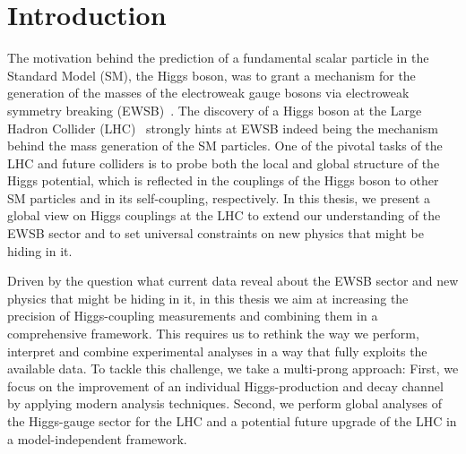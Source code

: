 %
%
%

\chapter{Introduction}\label{chap:introduction}
\enlargethispage{2ex}
\vspace*{-2pt}
The motivation behind the prediction of a fundamental scalar particle in the Standard Model (SM), 
the Higgs boson, was to grant
a mechanism for the generation of the masses of the electroweak gauge bosons via 
electroweak symmetry breaking (EWSB)~\cite{Higgs:1964pj,Higgs:1964ia,Englert:1964et}. 
The discovery of a Higgs boson at the Large Hadron Collider (LHC)~\cite{Aad:2012tfa,Chatrchyan:2012xdj} 
strongly hints at EWSB indeed being the mechanism behind the mass generation of the SM particles.
One of the pivotal tasks of the LHC and future colliders is to probe both the local and global structure of the Higgs 
potential,
which is reflected in the couplings of the Higgs boson to other SM particles and in its
self-coupling, respectively. 
In this thesis, we present a global view on Higgs couplings at the LHC
to extend our understanding of the EWSB sector and
to set universal constraints on new physics that might be hiding in it.
\\ \medskip \vspace*{-2pt}

Driven by the question what current data reveal about the  
EWSB sector and new physics that might be hiding in it, in this thesis 
we aim at increasing the precision of Higgs-coupling measurements 
and combining them in a comprehensive framework. 
This requires us to rethink the way we perform,  
interpret and combine experimental analyses in a way that fully exploits the available data. 
To tackle this challenge, we take a multi-prong approach:
First, we focus on the improvement of an individual Higgs-production and decay
channel by applying modern analysis techniques. Second, we perform global 
analyses of the Higgs-gauge sector for the LHC and a potential future upgrade 
of the LHC in a model-independent framework.
\\ \medskip \vspace*{-2pt}

